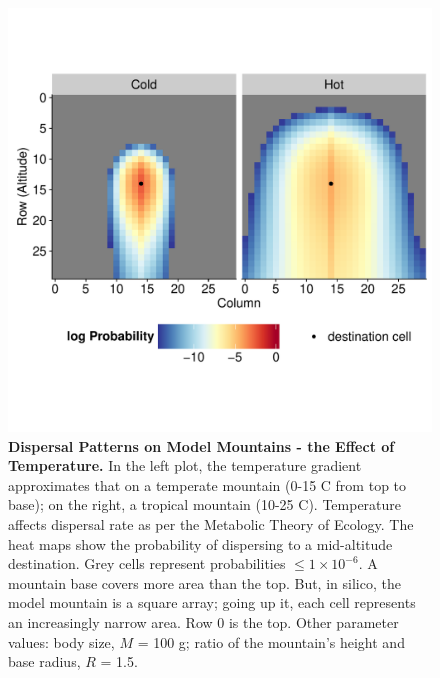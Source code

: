 \documentclass[11pt]{article}
\begin{document}
\newpage
\begin{figure}[!hbtp]

	\includegraphics[width=1\linewidth]{../Results/DispMaps/AreaTemp_ColdHot.pdf}
	\vspace*{-3cm}
	\caption{\textbf{Dispersal Patterns on Model Mountains - the Effect of Temperature.} In the left plot, the temperature gradient approximates that on a temperate mountain (0-15 \degree C from top to base); on the right, a tropical mountain (10-25 \degree C). Temperature affects dispersal rate as per the Metabolic Theory of Ecology. The heat maps show the probability of dispersing to a mid-altitude destination. Grey cells represent probabilities $\leq 1 \times 10^{-6}$. A mountain base covers more area than the top. But, in silico, the model mountain is a square array; going up it, each cell represents an increasingly narrow area. Row 0 is the top. Other parameter values: body size, $M$ = 100 g; ratio of the mountain's height and base radius, $R$ = 1.5.}
\label{DispMapTemp}
\end{figure}
\end{document}
